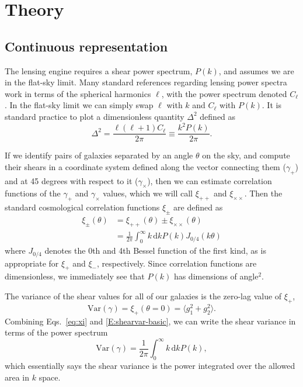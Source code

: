 \documentclass[preprint]{aastex}
\newcommand{\rmd}{\ensuremath{\mathrm{d}}}
\newcommand{\beq}{\begin{equation}}
\newcommand{\eeq}{\end{equation}}
\begin{document}
\section{Theory}\label{sect:theory}

\subsection{Continuous representation}

The lensing engine requires a shear power spectrum, $P(k)$, and
assumes we are in the flat-sky limit.  Many standard references
regarding lensing power spectra work in terms of the spherical
harmonics $\ell$, with the power spectrum denoted $C_\ell$.  In the
flat-sky limit we can simply swap $\ell$ with $k$ and $C_\ell$ with
$P(k)$.  It is standard practice to plot a dimensionless quantity
$\Delta^2$ defined as
\beq
\Delta^2 = \frac{\ell(\ell+1) C_{\ell}}{2\pi}\equiv \frac{k^2 P(k)}{2\pi}.
\eeq

If we identify pairs of galaxies separated by an angle $\theta$ on the
sky, and compute their shears in a coordinate
system defined along the vector connecting them ($\gamma_+$) and at 45
degrees with respect to it ($\gamma_\times$), then we can estimate 
correlation functions of the $\gamma_+$ and $\gamma_\times$ values,
which we will call $\xi_{++}$ and $\xi_{\times\times}$.  Then the
standard cosmological correlation functions $\xi_{\pm}$ are defined as
\begin{align}
\xi_{\pm}(\theta) &=  \xi_{++}(\theta)\pm \xi_{\times \times}(\theta) \\
 &= \frac{1}{2\pi}\int_0^{\infty} k\,\rmd k P(k) J_{0/4}(k\theta)  \label{eq:xi}
\end{align}
where $J_{0/4}$ denotes the 0th and 4th Bessel function of the first
kind, as is appropriate for $\xi_+$ and $\xi_-$, respectively. 
Since correlation functions are dimensionless, we immediately see that
$P(k)$ has dimensions of angle$^2$.

The variance of the shear values for all of our galaxies is the zero-lag value of $\xi_+$, 
\beq\label{E:shearvar-basic}
\mathrm{Var}(\gamma) = \xi_{+}(\theta=0) = \langle g_1^2 + g_2^2\rangle.
\eeq
Combining Eqs.~\ref{eq:xi} and \ref{E:shearvar-basic}, we can write
the shear variance in terms of the power
spectrum
\beq\label{E:shearvar}
\mathrm{Var}(\gamma) = \frac{1}{2\pi}\int_0^{\infty} k\,\rmd k P(k),
\eeq
which essentially says the shear variance is the power integrated over
the allowed area in $k$ space.
\end{document}
